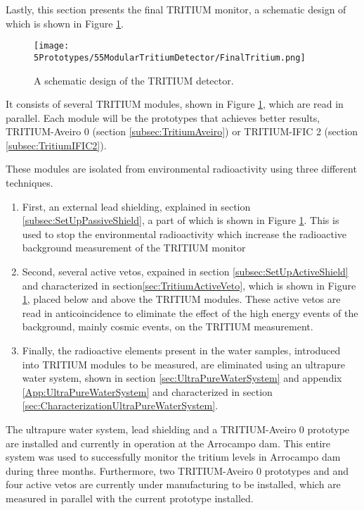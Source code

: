 Lastly, this section presents the final TRITIUM monitor, a schematic design of which is shown in Figure \ref{fig:TritiumDetectorSchematicDesign}.

\begin{figure}[h]
\centering
\texttt{[image: 5Prototypes/55ModularTritiumDetector/FinalTritium.png]}
\caption{A schematic design of the TRITIUM detector.\label{fig:TritiumDetectorSchematicDesign}}
\end{figure}

It consists of several TRITIUM modules, shown in Figure \ref{fig:TritiumDetectorSchematicDesign}, which are read in parallel. Each module will be the prototypes that achieves better results, TRITIUM-Aveiro 0 (section \ref{subsec:TritiumAveiro}) or TRITIUM-IFIC 2 (section \ref{subsec:TritiumIFIC2}).

These modules are isolated from environmental radioactivity using three different techniques.

\begin{enumerate}

\item{} First, an external lead shielding, explained in section \ref{subsec:SetUpPassiveShield}, a part of which is shown in Figure \ref{fig:TritiumDetectorSchematicDesign}. This is used to stop the environmental radioactivity which increase the radioactive background measurement of the TRITIUM monitor

\item{} Second, several active vetos, expained in section \ref{subsec:SetUpActiveShield} and characterized in section\ref{sec:TritiumActiveVeto}, which is shown in Figure \ref{fig:TritiumDetectorSchematicDesign}, placed below and above the TRITIUM modules. These active vetos are read in anticoincidence to eliminate the effect of the high energy events of the background, mainly cosmic events, on the TRITIUM measurement.

\item{} Finally, the radioactive elements present in the water samples, introduced into TRITIUM modules to be measured, are eliminated using an ultrapure water system, shown in section \ref{sec:UltraPureWaterSystem} and appendix \ref{App:UltraPureWaterSystem} and characterized in section \ref{sec:CharacterizationUltraPureWaterSystem}.

\end{enumerate}

The ultrapure water system, lead shielding and a TRITIUM-Aveiro 0 prototype are installed and currently in operation at the Arrocampo dam. This entire system was used to successfully monitor the tritium levels in Arrocampo dam during three months. Furthermore, two TRITIUM-Aveiro 0 prototypes and and four active vetos are currently under manufacturing to be installed, which are measured in parallel with the current prototype installed.

